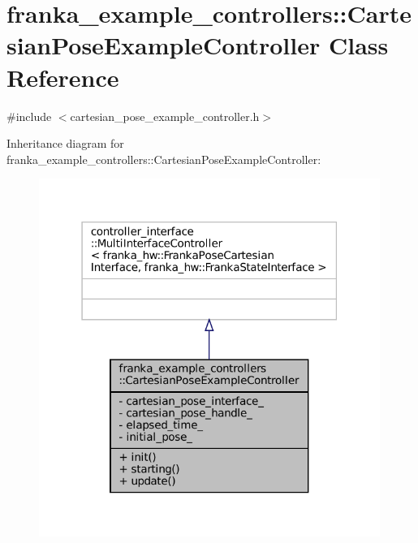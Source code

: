 \hypertarget{classfranka__example__controllers_1_1CartesianPoseExampleController}{}\section{franka\+\_\+example\+\_\+controllers\+:\+:Cartesian\+Pose\+Example\+Controller Class Reference}
\label{classfranka__example__controllers_1_1CartesianPoseExampleController}


{\ttfamily \#include $<$cartesian\+\_\+pose\+\_\+example\+\_\+controller.\+h$>$}



Inheritance diagram for franka\+\_\+example\+\_\+controllers\+:\+:Cartesian\+Pose\+Example\+Controller\+:
\nopagebreak
\begin{figure}[H]
\begin{center}
\leavevmode
\includegraphics[width=315pt]{classfranka__example__controllers_1_1CartesianPoseExampleController__inherit__graph}
\end{center}
\end{figure}


